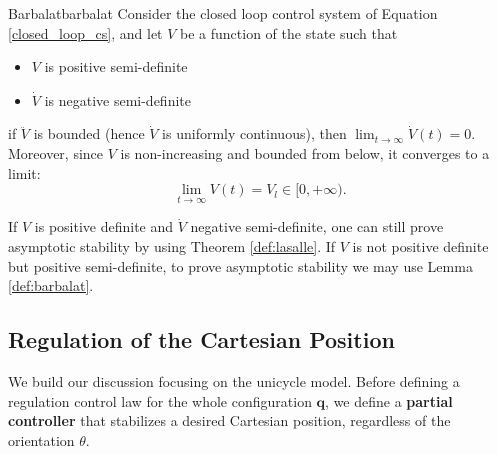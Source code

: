 \documentclass[10pt, a4paper]{report}
\newcommand{\q}{{\mathbf q}}
\begin{document}
\begin{boxlemma}{Barbalat}{barbalat}
    Consider the closed loop control system of Equation \eqref{closed_loop_cs}, and let $V$ be a function of the state such that
    \begin{itemize}
        \item $V$ is positive semi-definite
        \item $\dot V$ is negative semi-definite
    \end{itemize}
    if $\ddot V$ is bounded (hence $\dot V$ is uniformly continuous), then $\displaystyle\lim_{t\rightarrow\infty}\dot V(t)=0$. Moreover, since $V$ is non-increasing and bounded from below, it converges to a limit:\begin{equation}
        \lim_{t\rightarrow\infty} V(t)=V_l\in[0,+\infty).
    \end{equation}
\end{boxlemma}
If $V$ is positive definite and $\dot V$ negative semi-definite, one can still prove asymptotic stability by using Theorem \ref{def:lasalle}. If $V$ is not positive definite but positive semi-definite, to prove  asymptotic stability we may use Lemma \ref{def:barbalat}.
\subsection{Regulation of the Cartesian Position}
We build our discussion focusing on the unicycle model. Before defining a regulation control law for the whole configuration $\q$, we define a \textbf{partial controller} that stabilizes a desired Cartesian position, regardless of the orientation $\theta$.\bigskip
\end{document}
